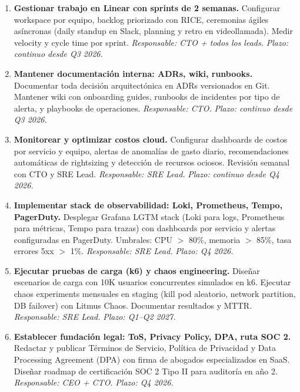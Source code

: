 ﻿\documentclass[11pt, letterpaper]{article}
\begin{document}
\begin{enumerate}[leftmargin=1.5cm, label=\textbf{OT\arabic*}, itemsep=2pt, topsep=4pt]
    \item \textbf{Gestionar trabajo en Linear con sprints de 2 semanas.} Configurar workspace por equipo, backlog priorizado con RICE, ceremonias ágiles asíncronas (daily standup en Slack, planning y retro en videollamada). Medir velocity y cycle time por sprint. \textit{Responsable: CTO + todos los leads.} \textit{Plazo: continuo desde Q3 2026.}



    \item \textbf{Mantener documentación interna: ADRs, wiki, runbooks.} Documentar toda decisión arquitectónica en ADRs versionados en Git. Mantener wiki con onboarding guides, runbooks de incidentes por tipo de alerta, y playbooks de operaciones. \textit{Responsable: CTO.} \textit{Plazo: continuo desde Q3 2026.}



    \item \textbf{Monitorear y optimizar costos cloud.} Configurar dashboards de costos por servicio y equipo, alertas de anomalías de gasto diario, recomendaciones automáticas de rightsizing y detección de recursos ociosos. Revisión semanal con CTO y SRE Lead. \textit{Responsable: SRE Lead.} \textit{Plazo: continuo desde Q4 2026.}



    \item \textbf{Implementar stack de observabilidad: Loki, Prometheus, Tempo, PagerDuty.} Desplegar Grafana LGTM stack (Loki para logs, Prometheus para métricas, Tempo para trazas) con dashboards por servicio y alertas configuradas en PagerDuty. Umbrales: CPU $>$ 80\%, memoria $>$ 85\%, tasa errores 5xx $>$ 1\%. \textit{Responsable: SRE Lead.} \textit{Plazo: Q4 2026.}



    \item \textbf{Ejecutar pruebas de carga (k6) y chaos engineering.} Diseñar escenarios de carga con 10K usuarios concurrentes simulados en k6. Ejecutar chaos experiments mensuales en staging (kill pod aleatorio, network partition, DB failover) con Litmus Chaos. Documentar resultados y MTTR. \textit{Responsable: SRE Lead.} \textit{Plazo: Q1--Q2 2027.}



    \item \textbf{Establecer fundación legal: ToS, Privacy Policy, DPA, ruta SOC 2.} Redactar y publicar Términos de Servicio, Política de Privacidad y Data Processing Agreement (DPA) con firma de abogados especializados en SaaS. Diseñar roadmap de certificación SOC 2 Tipo II para auditoría en año 2. \textit{Responsable: CEO + CTO.} \textit{Plazo: Q4 2026.}




\end{enumerate}
\end{document}
